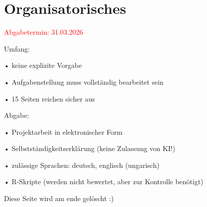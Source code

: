 
\section{Organisatorisches}
\textcolor{red}{Abgabetermin: 31.03.2026}


Umfang:


• keine explizite Vorgabe

• Aufgabenstellung muss vollständig bearbeitet sein

• 15 Seiten reichen sicher aus \newline

Abgabe:

• Projektarbeit in elektronischer Form

• Selbstständigkeitserklärung (keine Zulassung von KI!)

• zulässige Sprachen: deutsch, englisch (ungarisch)

• R-Skripte (werden nicht bewertet, aber zur Kontrolle benötigt)\newline 

Diese Seite wird am ende gelöscht :)